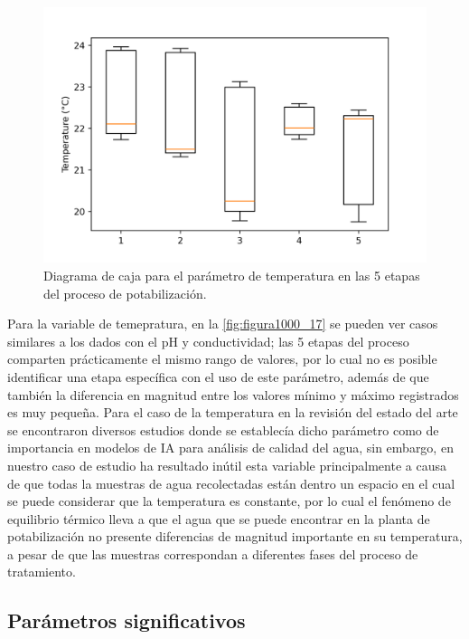 \begin{figure}[h]
	\centering
	\includegraphics[scale=1.0]{imgss167.png}
	\caption{Diagrama de caja para el parámetro de temperatura en las 5 etapas del proceso de potabilización.}
	\label{fig:figura1000_17}
\end{figure}

Para la variable de temepratura, en la \autoref{fig:figura1000_17} se pueden ver casos similares a los dados con el pH y conductividad; las 5 etapas del proceso comparten prácticamente el mismo rango de valores, por lo cual 
no es posible identificar una etapa específica con el uso de este parámetro, además de que también la diferencia en magnitud entre los valores mínimo y máximo registrados es muy pequeña. Para el caso de la temperatura en 
la revisión del estado del arte se encontraron diversos estudios donde se establecía dicho parámetro como de importancia en modelos de IA para análisis de calidad del agua, sin embargo, en nuestro caso de estudio ha resultado 
inútil esta variable principalmente a causa de que todas la muestras de agua recolectadas están dentro un espacio en el cual se puede considerar que la temperatura es constante, por lo cual el fenómeno de equilibrio térmico 
lleva a que el agua que se puede encontrar en la planta de potabilización no presente diferencias de magnitud importante en su temperatura, a pesar de que las muestras correspondan a diferentes fases del proceso de tratamiento.

\clearpage

\subsection{Parámetros significativos}

